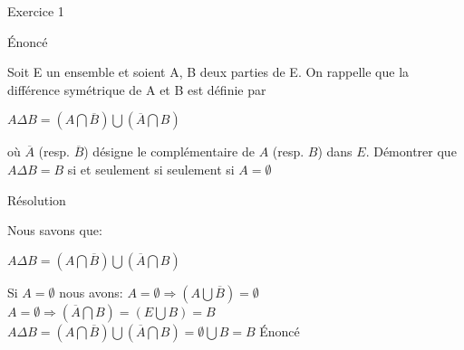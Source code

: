 \hypertarget{Introduction}{
\Huge{\begin{center}Exercice 1\end{center} \leavevmode\newline }}

\hypertarget{enonce}{%
\LARGE{Énoncé}\label{enonce}}

Soit E un ensemble et soient A, B deux parties de E. On rappelle que la différence symétrique de
A et B est définie par


$A \Delta B = (A \bigcap \overline{B}) \bigcup (\overline{A} \bigcap B)$

où $\overline{A}$ (resp. $\overline{B}$) désigne le complémentaire de $A$ (resp. $B$) dans $E$. Démontrer que $A \Delta B = B$ si et seulement si seulement si $A = \emptyset$

\hypertarget{resolution}{%
\LARGE{Résolution}\label{resolution}}


Nous savons que:


$A \Delta B = (A \bigcap \overline{B}) \bigcup (\overline{A} \bigcap B)$

Si $A = \emptyset$ nous avons:
\newline
$A = \emptyset \Rightarrow (A \bigcup \overline{B}) = \emptyset$
$A = \emptyset \Rightarrow (\overline{A} \bigcap B) = (E \bigcup B) = B$
$A \Delta B = (A \bigcap \overline{B}) \bigcup (\overline{A} \bigcap B) = \emptyset \bigcup B = B$
\hypertarget{enonce}{%
\LARGE{Énoncé}\label{enonce}}
